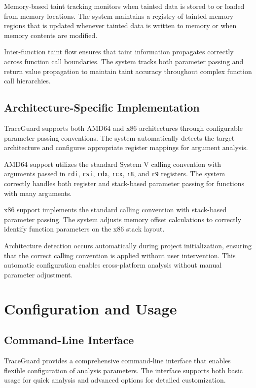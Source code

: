 Memory-based taint tracking monitors when tainted data is stored to or loaded from memory locations. The system maintains a registry of tainted memory regions that is updated whenever tainted data is written to memory or when memory contents are modified.

Inter-function taint flow ensures that taint information propagates correctly across function call boundaries. The system tracks both parameter passing and return value propagation to maintain taint accuracy throughout complex function call hierarchies.

\subsection{Architecture-Specific Implementation}

TraceGuard supports both AMD64 and x86 architectures through configurable parameter passing conventions. The system automatically detects the target architecture and configures appropriate register mappings for argument analysis.

AMD64 support utilizes the standard System V calling convention with arguments passed in \texttt{rdi}, \texttt{rsi}, \texttt{rdx}, \texttt{rcx}, \texttt{r8}, and \texttt{r9} registers. The system correctly handles both register and stack-based parameter passing for functions with many arguments.

x86 support implements the standard calling convention with stack-based parameter passing. The system adjusts memory offset calculations to correctly identify function parameters on the x86 stack layout.

Architecture detection occurs automatically during project initialization, ensuring that the correct calling convention is applied without user intervention. This automatic configuration enables cross-platform analysis without manual parameter adjustment.

\section{Configuration and Usage}\label{sec:configuration_and_usage}

\subsection{Command-Line Interface}

TraceGuard provides a comprehensive command-line interface that enables flexible configuration of analysis parameters. The interface supports both basic usage for quick analysis and advanced options for detailed customization.

